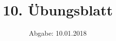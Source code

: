 
\usepackage{longtable}
\usepackage{wrapfig}
\usepackage{ dsfont }
\usepackage{tcolorbox}
\subject{SMD-Abgabe}
\title{10. Übungsblatt}
\date{%
  Abgabe: 10.01.2018
}


  \setlength{\parindent}{0em}
  \maketitle
  \thispagestyle{empty}
  \newpage

  \newenvironment{console1}[1]
  {\begin{center}
  \begin{minipage}[t]{0.99\linewidth}
  \begin{tcolorbox}[colback=gray!5,colframe=black!40!black,title= Ausgabe des Programms: #1 ]
    }
    {
  \end{tcolorbox}
  \end{minipage}
  \end{center}
  }

%
%



